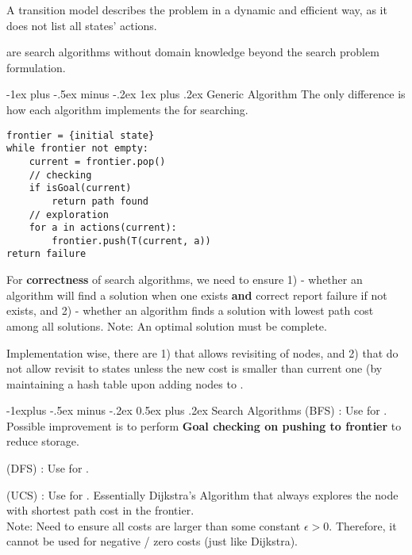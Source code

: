\documentclass[10pt,landscape,letterpaper]{article}
\makeatletter
\renewcommand{\subsection}{\@startsection{subsection}{2}{0mm}%
                                {-1explus -.5ex minus -.2ex}%
                                {0.5ex plus .2ex}%
                                {\sffamily\normalsize\itshape}}
\renewcommand{\subsubsection}{\@startsection{subsubsection}{3}{0mm}%
                                {-1ex plus -.5ex minus -.2ex}%
                                {1ex plus .2ex}%
                                {\normalfont\small\itshape}}
\makeatother
\begin{document}
\begin{multicols}{3}
A transition model describes the problem in a dynamic and efficient way, as it does not list all states' actions.
\smallskip

 are search algorithms without domain knowledge beyond the search problem formulation.


\subsubsection{Generic Algorithm}
The only difference is how each algorithm implements the  for searching. 

\begin{lstlisting}
frontier = {initial state}
while frontier not empty:
    current = frontier.pop()
	// checking
	if isGoal(current) 
		return path found
	// exploration
	for a in actions(current):
		frontier.push(T(current, a)) 
return failure
\end{lstlisting}

For \textbf{correctness} of search algorithms, we need to ensure 1)  - whether an algorithm will find a solution when one exists \textbf{and} correct report failure if not exists, and 2)  - whether an algorithm finds a solution with lowest path cost among all solutions.
Note: An optimal solution must be complete.
\smallskip

Implementation wise, there are 1)  that allows revisiting of nodes, and 2)  that do not allow revisit to states unless the new cost is smaller than current one (by maintaining a  hash table upon adding nodes to . 


\subsection{Search Algorithms}
 (BFS) : Use  for . Possible improvement is to perform \textbf{Goal checking on pushing to frontier} to reduce storage.

\smallskip

 (DFS) : Use  for .
\smallskip

 (UCS) : Use  for . Essentially Dijkstra's Algorithm that always explores the node with shortest path cost in the frontier.
\\
Note: Need to ensure all costs are larger than some constant $\epsilon > 0$. Therefore, it cannot be used for negative / zero costs (just like Dijkstra).
\smallskip


\end{multicols}
\end{document}

